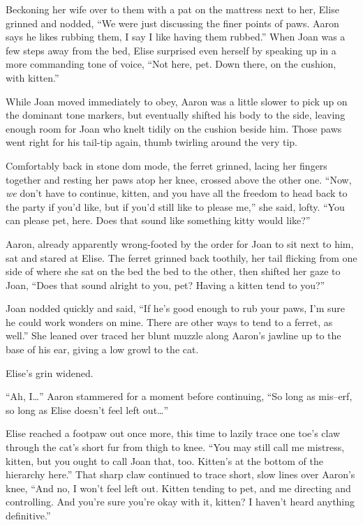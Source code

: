 Beckoning her wife over to them with a pat on the mattress next to her, Elise grinned and nodded, ``We were just discussing the finer points of paws. Aaron says he likes rubbing them, I say I like having them rubbed.'' When Joan was a few steps away from the bed, Elise surprised even herself by speaking up in a more commanding tone of voice, ``Not here, pet. Down there, on the cushion, with kitten.''

While Joan moved immediately to obey, Aaron was a little slower to pick up on the dominant tone markers, but eventually shifted his body to the side, leaving enough room for Joan who knelt tidily on the cushion beside him. Those paws went right for his tail-tip again, thumb twirling around the very tip.

Comfortably back in stone dom mode, the ferret grinned, lacing her fingers together and resting her paws atop her knee, crossed above the other one. ``Now, \emph{we} don't have to continue, kitten, and you have all the freedom to head back to the party if you'd like, but if you'd still like to please me,'' she said, lofty. ``You can please pet, here. Does that sound like something kitty would like?''

Aaron, already apparently wrong-footed by the order for Joan to sit next to him, sat and stared at Elise. The ferret grinned back toothily, her tail flicking from one side of where she sat on the bed the bed to the other, then shifted her gaze to Joan, ``Does that sound alright to you, pet? Having a kitten tend to you?''

Joan nodded quickly and said, ``If he's good enough to rub your paws, I'm sure he could work wonders on mine. There are other ways to tend to a ferret, as well.'' She leaned over traced her blunt muzzle along Aaron's jawline up to the base of his ear, giving a low growl to the cat.

Elise's grin widened.

``Ah, I\ldots{}'' Aaron stammered for a moment before continuing, ``So long as mis--erf, so long as Elise doesn't feel left out\ldots{}''

Elise reached a footpaw out once more, this time to lazily trace one toe's claw through the cat's short fur from thigh to knee. ``You may still call me mistress, kitten, but you ought to call Joan that, too. Kitten's at the bottom of the hierarchy here.'' That sharp claw continued to trace short, slow lines over Aaron's knee, ``And no, I won't feel left out. Kitten tending to pet, and me directing and controlling. And you're sure you're okay with it, kitten? I haven't heard anything definitive.''

